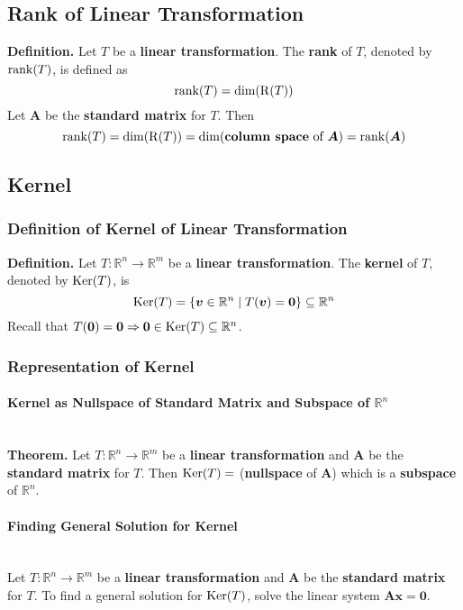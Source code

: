\documentclass[../ma2001_notes.tex]{subfiles}
\begin{document}
\subsection{Rank of Linear Transformation}
\textbf{Definition.} Let \(T\) be a \textbf{linear transformation}. The \textbf{rank} of \(T\), denoted by \(\operatorname{rank}(T)\), is defined as
\[\operatorname{rank}(T)=\dim(\operatorname{R}(T))\]
Let \(\bm{A}\) be the \textbf{standard matrix} for \(T\). Then
\[\operatorname{rank}(T)=\dim(\operatorname{R}(T))=\dim(\textbf{column space}\text{ of }\bm{A})=\operatorname{rank}(\bm{A})\]

\subsection{Kernel}
\subsubsection{Definition of Kernel of Linear Transformation}
\textbf{Definition.} Let \(T:\mathbb{R}^n\to\mathbb{R}^m\) be a \textbf{linear transformation}. The \textbf{kernel} of \(T\), denoted by \(\operatorname{Ker}(T)\), is
\[\operatorname{Ker}(T)=\{\bm{v}\in\mathbb{R}^n\mid T(\bm{v})=\bm{0}\}\subseteq\mathbb{R}^n\]
Recall that \(T(\bm{0})=\bm{0}\Rightarrow\bm{0}\in\operatorname{Ker}(T)\subseteq\mathbb{R}^n\).

\subsubsection{Representation of Kernel}
\paragraph{Kernel as Nullspace of Standard Matrix and Subspace of $\mathbb{R}^n$}\,\\
\textbf{Theorem.} Let \(T:\mathbb{R}^n\to\mathbb{R}^m\) be a \textbf{linear transformation} and \(\bm{A}\) be the \textbf{standard matrix} for \(T\). Then \(\operatorname{Ker}(T)=\) (\textbf{nullspace} of \(\bm{A}\)) which is a \textbf{subspace} of \(\mathbb{R}^n\).

\paragraph{Finding General Solution for Kernel}\,\\
Let \(T:\mathbb{R}^n\to\mathbb{R}^m\) be a \textbf{linear transformation} and \(\bm{A}\) be the \textbf{standard matrix} for \(T\). To find a general solution for \(\operatorname{Ker}(T)\), solve the linear system \(\bm{Ax}=\bm{0}\).
\end{document}
